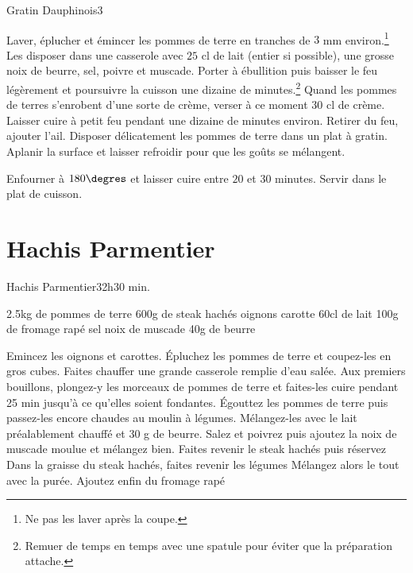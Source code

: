 {\begin{recette}{Gratin Dauphinois}{3}{}{}
\begin{preparation}
\etape Laver, éplucher et émincer les pommes de terre en tranches de $3$ mm environ.\footnote{Ne pas les laver après la coupe.}
\etape Les disposer dans une casserole avec $25$ cl de lait (entier si possible), une grosse noix de beurre, sel, poivre et 
muscade.
\etape Porter à ébullition puis baisser le feu légèrement et poursuivre la cuisson une dizaine de minutes.\footnote{Remuer de 
temps en temps avec une spatule pour éviter que la préparation attache.}
\etape Quand les pommes de terres s'enrobent d'une sorte de crème, verser à ce moment $30$ cl de crème.
\etape Laisser cuire à petit feu pendant une dizaine de minutes environ.
\etape Retirer du feu, ajouter l'ail.
\etape Disposer délicatement les pommes de terre dans un plat à gratin.
\etape Aplanir la surface et laisser refroidir pour que les goûts se mélangent.
\end{preparation}

\begin{cuisson}
Enfourner à $180\degres$ et laisser cuire entre $20$ et $30$ minutes. Servir dans le plat de cuisson.
\end{cuisson}
\end{recette}

\section{Hachis Parmentier}
\begin{recette}{Hachis Parmentier}{3}{2h}{30 min.}
\begin{ingredients}
\ingredient 2.5kg de pommes de terre
\ingredient 600g de steak hachés
 oignons
 carotte
\ingredient 60cl de lait
\ingredient 100g de fromage rapé
\ingredient sel
\ingredient noix de muscade
\ingredient 40g de beurre
\end{ingredients}

\begin{preparation}
\etape Emincez les oignons et carottes.
\etape Épluchez les pommes de terre et coupez-les en gros cubes. 
\etape Faites chauffer une grande casserole remplie d’eau salée. Aux premiers bouillons, plongez-y les morceaux de pommes de terre et faites-les cuire pendant 25 min jusqu’à ce qu’elles soient fondantes.
\etape Égouttez les pommes de terre puis passez-les encore chaudes au moulin à légumes. 
\etape Mélangez-les avec le lait préalablement chauffé et 30 g de beurre. Salez et poivrez puis ajoutez la noix de muscade moulue et mélangez bien.
\etape Faites revenir le steak hachés puis réservez
\etape Dans la graisse du steak hachés, faites revenir les légumes
\etape Mélangez alors le tout avec la purée. Ajoutez enfin du fromage rapé
\end{preparation}


\end{recette}}
